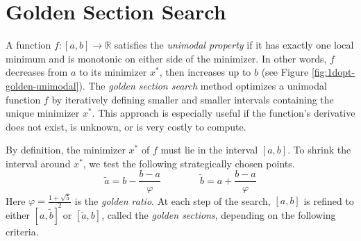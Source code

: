 \labdependencies{}

\section*{Golden Section Search} %

A function $f:[a,b]\rightarrow\mathbb{R}$ satisfies the \emph{unimodal property} if it has exactly one local minimum and is monotonic on either side of the minimizer.
In other words, $f$ decreases from $a$ to its minimizer $x^*$, then increases up to $b$ (see Figure \ref{fig:1dopt-golden-unimodal}).
The \emph{golden section search} method optimizes a unimodal function $f$ by iteratively defining smaller and smaller intervals containing the unique minimizer $x^*$.
This approach is especially useful if the function's derivative does not exist, is unknown, or is very costly to compute.

By definition, the minimizer $x^*$ of $f$ must lie in the interval $[a,b]$.
To shrink the interval around $x^*$, we test the following strategically chosen points.
\begin{equation*}
\tilde{a} = b - \frac{b - a}{\varphi}\qquad\qquad
\tilde{b} = a + \frac{b - a}{\varphi}
\end{equation*}
Here $\varphi = \frac{1 + \sqrt{5}}{2}$ is the \emph{golden ratio}.
At each step of the search, $[a,b]$ is refined to either $[a,\tilde{b}]$ or $[\tilde{a}, b]$, called the \emph{golden sections}, depending on the following criteria.

